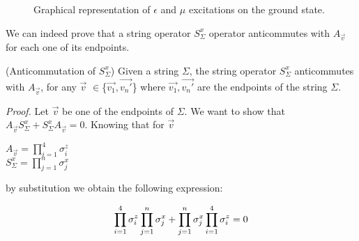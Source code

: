 \documentclass{Configuration_Files/PoliMi3i_thesis}
\begin{document}
\begin{figure}
\begin{center}
	\end{center}
	
	\caption{Graphical representation of $\epsilon$ and $\mu$ excitations on the ground state.}
	\label{fig:excitations}
\end{figure}





We can indeed prove that a string operator $S^x_\Sigma$ operator anticommutes with $A_{\vec{v}} $ for each one of its endpoints. 

\begin{proposition}(Anticommutation of $S^x_\Sigma$)
	Given a string $\Sigma$, the string operator $S^x_\Sigma$ anticommutes with $A_{\vec{v}} $, for any $\vec{v}$ $\in$\{$\vec{v_1},\vec{v_n'}$\} where $\vec{v_1},\vec{v_n'}$ are the endpoints of the string $\Sigma$.
\end{proposition}

\textit{Proof.}\newline
Let $\vec{v}$ be one of the endpoints of $\Sigma$. We want to show that $A_{\vec{v}} S^x_\Sigma + S^x_\Sigma A_{\vec{v}}=0$. Knowing that for $\vec{v}$

\begin{center}
	$A_{\vec{v}} = \prod_{i=1}^{4} \sigma_i^z$ \\ 
	$S^x_\Sigma = \prod_{j=1}^{n} \sigma_j^x$
\end{center}

by substitution we obtain the following expression: 

\begin{equation}
	\space\prod_{i=1}^{4} \sigma_i^z \prod_{j=1}^{n} \sigma_j^x + \prod_{j=1}^{n} \sigma_j^x \prod_{i=1}^{4} \sigma_i^z = 0  
\end{equation}
\end{document}
